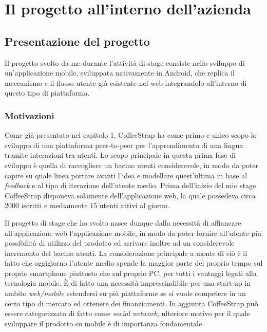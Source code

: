 
\chapter{Il progetto all'interno dell'azienda}
\label{cap:progetto-azienda}

\section{Presentazione del progetto}

Il progetto svolto da me durante l'attività di stage consiste nello sviluppo di un'applicazione mobile, sviluppata nativamente in Android, che replica il meccanismo e il flusso utente già esistente nel web integrandolo all'interno di questo tipo di piattaforma. 

\subsection{Motivazioni}

Come già presentato nel capitolo 1, CoffeeStrap ha come primo e unico scopo lo sviluppo di una piattaforma peer-to-peer per l'apprendimento di una lingua tramite interazioni tra utenti. Lo scopo principale in questa prima fase di sviluppo è quella di raccogliere un bacino utenti considerevole, in modo da poter capire su quale linea portare avanti l'idea e modellare quest'ultima in base al \textit{feedback} e al tipo di iterazione dell'utente medio. Prima dell'inizio del mio stage CoffeeStrap disponeva solamente dell'applicazione web, la quale possedeva circa 2000 iscritti e mediamente 15 utenti attivi al giorno. 

Il progetto di stage che ho svolto nasce dunque dalla necessità di affiancare all'applicazione web l'applicazione mobile, in modo da poter fornire all'utente più possibilità di utilizzo del prodotto ed arrivare inoltre ad un considerevole incremento del bacino utenti. La considerazione principale a monte di ciò è il fatto che oggigiorno l'utente medio spende la maggior parte del proprio tempo sul proprio smartphone piuttosto che sul proprio PC, per tutti i vantaggi legati alla tecnologia mobile. È di fatto una necessità imprescindibile per una start-up in ambito \textit{web/mobile} estendersi su più piattaforme se si vuole competere in un certo tipo di mercato ed ottenere dei finanziamenti. In aggiunta CoffeeStrap può essere categorizzato di fatto come \textit{social network}, ulteriore motivo per il quale sviluppare il prodotto su mobile è di importanza fondamentale.

